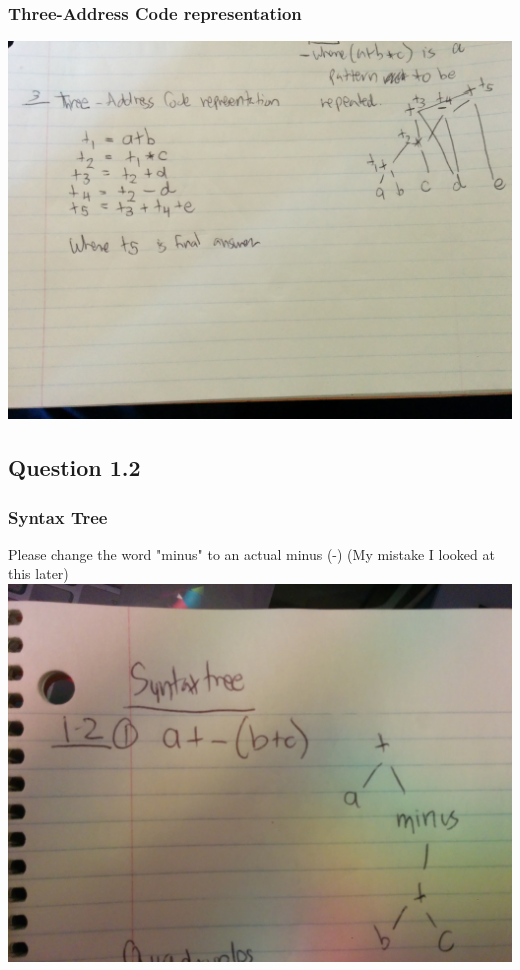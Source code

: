 \documentclass[11pt, oneside]{article}   	%
\begin{document}
\subsubsection{Three-Address Code representation}
\includegraphics[scale=0.12]{IMG_20141025_154609.jpg}

\subsection{Question 1.2}

\subsubsection{Syntax Tree}
\par Please change the word "minus" to an actual minus (-) (My mistake I looked at this later) \\
\includegraphics[scale=0.12]{IMG_20141028_235513.jpg}
\end{document}
